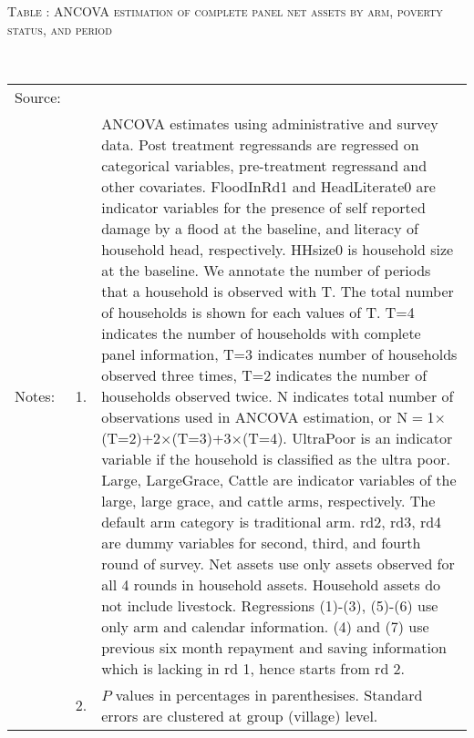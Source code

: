 \hspace{-1cm}\begin{minipage}[t]{14cm}
\hfil\textsc{\normalsize Table \thetable: ANCOVA estimation of complete panel net assets by arm, poverty status, and period\label{tab ANCOVA narrow complete panel net assets timevarying poverty status}}\\
\setlength{\tabcolsep}{1pt}
\setlength{\baselineskip}{8pt}
\renewcommand{\arraystretch}{.55}
\hfil{}\\
\renewcommand{\arraystretch}{.8}
\setlength{\tabcolsep}{1pt}
\begin{tabular}{>{\hfill\scriptsize}p{1cm}<{}>{\hfill\scriptsize}p{.25cm}<{}>{\scriptsize}p{12cm}<{\hfill}}
Source:& \multicolumn{2}{l}{\scriptsize Estimated with GUK administrative and survey data.}\\
Notes: & 1. & ANCOVA estimates using administrative and survey data. Post treatment regressands are regressed on categorical variables, pre-treatment regressand and other covariates. \textsf{FloodInRd1} and \textsf{HeadLiterate0} are indicator variables for the presence of self reported damage by a flood at the baseline, and literacy of household head, respectively. \textsf{HHsize0} is household size at the baseline. We annotate the number of periods that a household is observed with \textsf{T}. The total number of households is shown for each values of \textsf{T}. \textsf{T=4} indicates the number of households with complete panel information, \textsf{T=3} indicates number of households observed three times, \textsf{T=2} indicates the number of households observed twice. \textsf{N} indicates total number of observations used in ANCOVA estimation, or \textsf{N$=$1$\times$(T=2)+2$\times$(T=3)+3$\times$(T=4)}.  \textsf{UltraPoor} is an indicator variable if the household is classified as the ultra poor. \textsf{Large}, \textsf{LargeGrace}, \textsf{Cattle} are indicator variables of the \textsf{large}, \textsf{large grace}, and \textsf{cattle} arms, respectively. The default arm category is \textsf{traditional} arm. \textsf{rd2, rd3, rd4} are dummy variables for second, third, and fourth round of survey. Net assets use only assets observed for all 4 rounds in household assets. Household assets do not include livestock. Regressions (1)-(3), (5)-(6) use only arm and calendar information. (4) and (7) use previous six month repayment and saving information which is lacking in rd 1, hence starts from rd 2.\\
& 2. & $P$ values in percentages in parenthesises. Standard errors are clustered at group (village) level.
\end{tabular}
\end{minipage}

